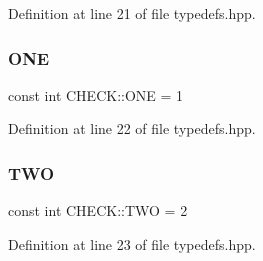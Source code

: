 Definition at line 21 of file typedefs.\+hpp.

\mbox{\label{namespace_c_h_e_c_k_acf8ecf93ddfb75456112712630f8f722}} 
\subsubsection{\texorpdfstring{O\+NE}{ONE}}
{\footnotesize\ttfamily const int C\+H\+E\+C\+K\+::\+O\+NE = 1}



Definition at line 22 of file typedefs.\+hpp.

\mbox{\label{namespace_c_h_e_c_k_a2b112aaec4c59311376a5a60f291aa48}} 
\subsubsection{\texorpdfstring{T\+WO}{TWO}}
{\footnotesize\ttfamily const int C\+H\+E\+C\+K\+::\+T\+WO = 2}



Definition at line 23 of file typedefs.\+hpp.

